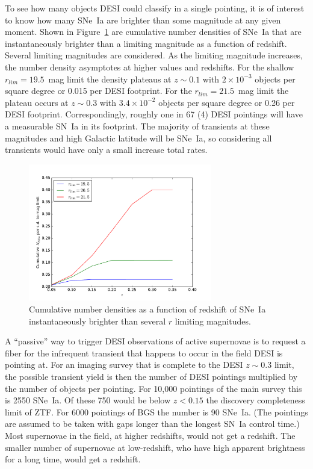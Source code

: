 \documentclass{article}   	%
\begin{document}
To see how many objects DESI could classify in a single pointing, 
it is of interest to know how many SNe~Ia are brighter than some magnitude at any given moment.
Shown in Figure~\ref{cum:fig} are cumulative number densities of SNe~Ia that are instantaneously brighter than a limiting magnitude as a function of redshift.
Several limiting magnitudes are considered. 
As the limiting magnitude increases, the number density asymptotes at higher values and redshifts.  For the shallow $r_{lim}=19.5$~mag limit the density plateaus at $z \sim 0.1$ with $2\times 10^{-3}$ objects per square degree or 0.015 per DESI footprint.   For the $r_{lim}=21.5$~mag limit the plateau occurs at $z \sim 0.3$ with $3.4\times 10^{-2}$ objects per square degree or 0.26 per DESI footprint.  Correspondingly, roughly one in 67 (4) DESI pointings will have a measurable SN~Ia in its footprint.
The majority of transients at these magnitudes and high Galactic latitude will be SNe~Ia, so considering all transients would have only a small increase total rates.

\begin{figure}[h]
\includegraphics[width=8cm]{../src/cumulative.pdf}
\centering
\caption{Cumulative number densities as a function of redshift of SNe~Ia instantaneously brighter than several $r$ limiting magnitudes.
\label{cum:fig}}
\end{figure}

A ``passive'' way to trigger DESI observations of active supernovae is to request a fiber for the infrequent transient
that happens to occur in the field DESI is pointing at.  For an imaging survey that is complete to the DESI 
$z\sim0.3$ limit, the possible transient yield is then the number of DESI pointings multiplied by the number of objects per pointing.  For 10,000 pointings of the
main survey this is 2550 SNe~Ia.  Of these 750 would be below $z<0.15$ the discovery completeness limit of ZTF.  
For 6000 pointings of BGS the number is  90 SNe~Ia.  (The pointings are assumed to be taken with gaps longer than the longest SN~Ia control time.)
Most supernovae in the field, at higher redshifts, would not get a redshift.  The smaller number of supernovae at low-redshift, who have high apparent brightness
for a long time, would get a redshift.
\end{document}
